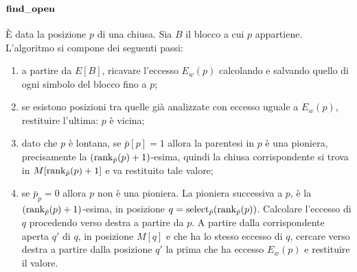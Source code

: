 \paragraph{$\mathbf{find\_open}$} È data la posizione $p$ di una chiusa. Sia $B$ il blocco a cui $p$ appartiene.
L'algoritmo si compone dei seguenti passi:
\begin{enumerate}
	\item a partire da $E[B]$, ricavare l'eccesso $E_w(p)$ calcolando e salvando quello di ogni simbolo del blocco fino a $p$;
	\item se esistono posizioni tra quelle già analizzate con eccesso uguale a $E_w(p)$, restituire l'ultima: $p$ è vicina;
	\item dato che $p$ è lontana, se $\bar p[p]=1$ allora la parentesi in $p$ è una pioniera, precisamente la $(\mathrm{rank}_{\bar p}(p)+1)$-esima, quindi la chiusa corrispondente si trova in $M[\mathrm{rank}_{\bar p}(p)+1]$ e va restituito tale valore;
	\item se $\bar p_p=0$ allora $p$ non è una pioniera.
	      La pioniera successiva a $p$, è la $(\mathrm{rank}_{\bar p}(p)+1)$-esima, in posizione $q=\mathrm{select}_{\bar p}(\mathrm{rank}_{\bar p}(p))$.
	      Calcolare l'eccesso di $q$ procedendo verso destra a partire da $p$.
	      A partire dalla corrispondente aperta $q'$ di $q$, in posizione $M[q]$ e che ha lo stesso eccesso di $q$, cercare verso destra a partire dalla posizione $q'$ la prima che ha eccesso $E_w(p)$ e restituire il valore.
\end{enumerate}

